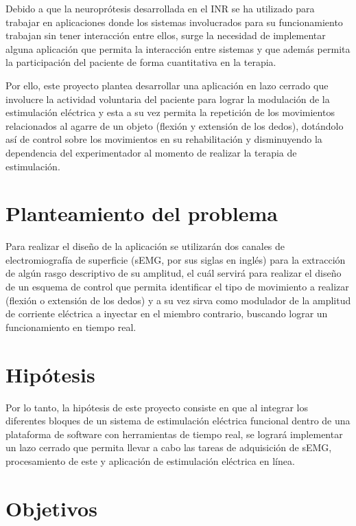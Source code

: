 Debido a que la neuroprótesis desarrollada en el INR se ha utilizado para trabajar en aplicaciones donde los sistemas involucrados para su funcionamiento trabajan sin tener interacción entre ellos, surge la necesidad de implementar alguna aplicación que permita la interacción entre sistemas y que además permita la participación del paciente de forma cuantitativa en la terapia.

Por ello, este proyecto plantea desarrollar una aplicación en lazo cerrado que involucre la actividad voluntaria del paciente para lograr la modulación de la estimulación eléctrica y esta a su vez permita la repetición de los movimientos relacionados al agarre de un objeto (flexión y extensión de los dedos), dotándolo así de control sobre los movimientos en su rehabilitación y disminuyendo la dependencia del experimentador al momento de realizar la terapia de estimulación.

\section{Planteamiento del problema}

Para realizar el diseño de la aplicación se utilizarán dos canales de electromiografía de superficie (sEMG, por sus siglas en inglés) para la extracción de algún rasgo descriptivo de su amplitud, el cuál servirá para realizar el diseño de un esquema de control que permita identificar el tipo de movimiento a realizar (flexión o extensión de los dedos) y a su vez sirva como modulador de la amplitud de corriente eléctrica a inyectar en el miembro contrario, buscando lograr un funcionamiento en tiempo real.

\section{Hipótesis}

Por lo tanto, la hipótesis de este proyecto consiste en que al integrar los diferentes bloques de un sistema de estimulación eléctrica funcional dentro de una plataforma de software con herramientas de tiempo real, se logrará implementar un lazo cerrado que permita llevar a cabo las tareas de adquisición de sEMG, procesamiento de este y aplicación de estimulación eléctrica en línea.

\section{Objetivos}

